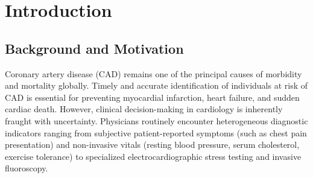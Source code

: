 \documentclass[12pt,a4paper]{report}
\begin{document}
\gdef \title{Bayesian Network for Medical Diagnosis}
\gdef \dept{Centre for Artificial Intelligence}
\gdef \degree{Master of Technology}
\gdef \branch{Artificial Intelligence}
\gdef \college{TKM College of Engineering}
\gdef \collegeplace{Kollam}

\gdef \author{SREERAM S}
\gdef \rollno{TKM25MEAI15}
\gdef \deptabbr{Dept. of CSE}

\gdef \guide{Prof. Sabeena K}
\gdef \guidedes{Assistant Professor}

\gdef \procordinatorA{Prof. Swathy S}
\gdef \procordinatorAdes{Assistant Professor}

\gdef \procordinatorB{Prof. Project Coordinator 2}
\gdef \procordinatorBdes{Assistant Professor}

\gdef \hod{Dr. Smitha P}
\gdef \hoddes{Professor and Head}

\gdef \acadyear{2025 - 26}
\gdef \month{NOVEMBER 2026}
\gdef \date{10-11-2026}





\thispagestyle{empty}
\newpage
    
\tableofcontents
\listoffigures
\listoftables

\cleardoublepage
\setcounter{page}{1}

\chapter{Introduction}

\section{Background and Motivation}

Coronary artery disease (CAD) remains one of the principal causes of morbidity and mortality globally. Timely and accurate identification of individuals at risk of CAD is essential for preventing myocardial infarction, heart failure, and sudden cardiac death. However, clinical decision-making in cardiology is inherently fraught with uncertainty. Physicians routinely encounter heterogeneous diagnostic indicators ranging from subjective patient-reported symptoms (such as chest pain presentation) and non-invasive vitals (resting blood pressure, serum cholesterol, exercise tolerance) to specialized electrocardiographic stress testing and invasive fluoroscopy.
\end{document}
